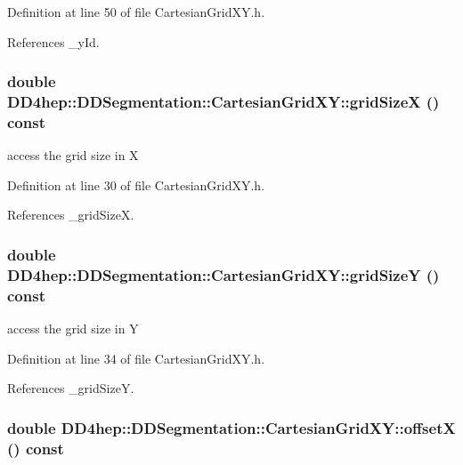 Definition at line 50 of file CartesianGridXY.h.

References \_\-yId.\hypertarget{class_d_d4hep_1_1_d_d_segmentation_1_1_cartesian_grid_x_y_afe3cadfcc4e9e34f0e9ce3249b27a81d}{
\subsubsection[{gridSizeX}]{\setlength{\rightskip}{0pt plus 5cm}double DD4hep::DDSegmentation::CartesianGridXY::gridSizeX () const}}
\label{class_d_d4hep_1_1_d_d_segmentation_1_1_cartesian_grid_x_y_afe3cadfcc4e9e34f0e9ce3249b27a81d}


access the grid size in X 

Definition at line 30 of file CartesianGridXY.h.

References \_\-gridSizeX.\hypertarget{class_d_d4hep_1_1_d_d_segmentation_1_1_cartesian_grid_x_y_aba05b046286981c8aec7d8d4bb39838e}{
\subsubsection[{gridSizeY}]{\setlength{\rightskip}{0pt plus 5cm}double DD4hep::DDSegmentation::CartesianGridXY::gridSizeY () const}}
\label{class_d_d4hep_1_1_d_d_segmentation_1_1_cartesian_grid_x_y_aba05b046286981c8aec7d8d4bb39838e}


access the grid size in Y 

Definition at line 34 of file CartesianGridXY.h.

References \_\-gridSizeY.\hypertarget{class_d_d4hep_1_1_d_d_segmentation_1_1_cartesian_grid_x_y_a53dd6d89c5818f455e9a6a284ada776e}{
\subsubsection[{offsetX}]{\setlength{\rightskip}{0pt plus 5cm}double DD4hep::DDSegmentation::CartesianGridXY::offsetX () const}}
\label{class_d_d4hep_1_1_d_d_segmentation_1_1_cartesian_grid_x_y_a53dd6d89c5818f455e9a6a284ada776e}


